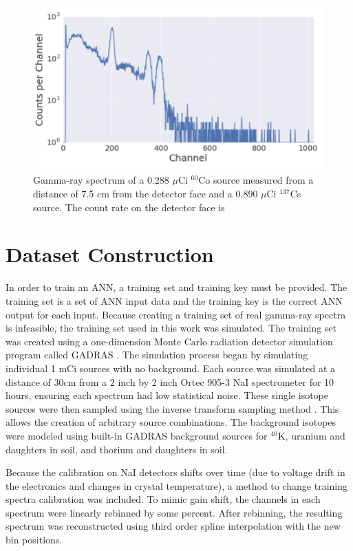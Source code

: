 \documentclass[tocnosub,noragright,centerchapter,12pt,fullpage]{uiucecethesis09}
\begin{document}
\begin{figure}[H]
    \centering
    \includegraphics[width=0.5\linewidth]{images/CoCs_mix}
    \caption{Gamma-ray spectrum of a 0.288 $\mu$Ci $^{60}$Co source measured from a distance of 7.5 cm from the detector face and a 0.890 $\mu$Ci $^{137}$Cs source. The count rate on the detector face is  }
    \label{fig:top_five}
\end{figure}


\section{Dataset Construction}

In order to train an ANN, a training set and training key must be provided. The training set is a set of ANN input data and the training key is the correct ANN output for each input. Because creating a training set of real gamma-ray spectra is infeasible, the training set used in this work was simulated. The training set was created using a one-dimension Monte Carlo radiation detector simulation program called GADRAS \cite{mitchell2014}. The simulation process began by simulating individual 1 mCi sources with no background. Each source was simulated at a distance of 30cm from a 2 inch by 2 inch Ortec 905-3 NaI spectrometer for 10 hours, ensuring each spectrum had low statistical noise. These single isotope sources were then sampled using the inverse transform sampling method \cite{Devroyne}. This allows the creation of arbitrary source combinations. The background isotopes were modeled using built-in GADRAS background sources for $^{40}$K, uranium and daughters in soil, and thorium and daughters in soil.

Because the calibration on NaI detectors shifts over time (due to voltage drift in the electronics and changes in crystal temperature), a method to change training spectra calibration was included. To mimic gain shift, the channels in each spectrum were linearly rebinned by some percent. After rebinning, the resulting spectrum was reconstructed using third order spline interpolation with the new bin positions.
\end{document}
